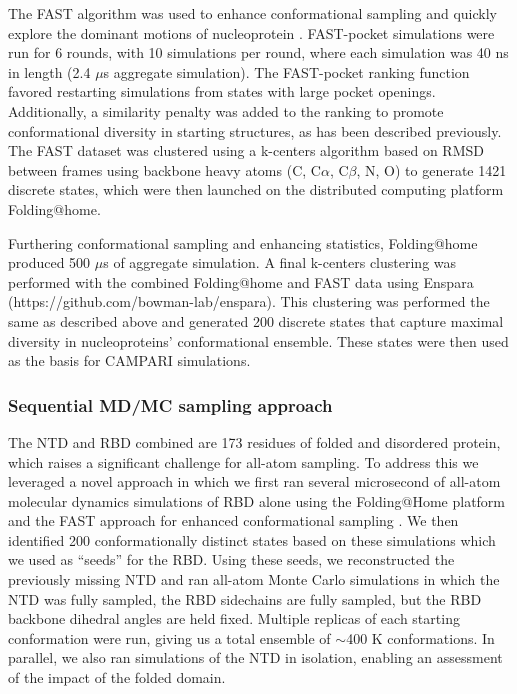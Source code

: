 \documentclass[../main.tex]{subfiles}
\begin{document}
        The FAST algorithm was used to enhance conformational sampling and quickly explore the dominant motions of nucleoprotein \cite{zimmerman_fast_2015,Zimmerman:2018jn}. FAST-pocket simulations were run for 6 rounds, with 10 simulations per round, where each simulation was 40 ns in length (2.4 $\mu$s aggregate simulation). The FAST-pocket ranking function favored restarting simulations from states with large pocket openings. Additionally, a similarity penalty was added to the ranking to promote conformational diversity in starting structures, as has been described previously\cite{zimmerman_prediction_2017}. The FAST dataset was clustered using a k-centers algorithm based on RMSD between frames using backbone heavy atoms (C, C$\alpha$, C$\beta$, N, O) to generate 1421 discrete states, which were then launched on the distributed computing platform Folding@home\cite{Shirts:2000du,Zimmerman2020covid-pocket}.

        Furthering conformational sampling and enhancing statistics, Folding@home produced 500 $\mu$s of aggregate simulation. A final k-centers clustering was performed with the combined Folding@home and FAST data using Enspara (https://github.com/bowman-lab/enspara)\cite{porter2018enspara}. This clustering was performed the same as described above and generated 200 discrete states that capture maximal diversity in nucleoproteins’ conformational ensemble. These states were then used as the basis for CAMPARI simulations.

    \subsubsection{Sequential MD/MC sampling approach}
        The NTD and RBD combined are 173 residues of folded and disordered protein, which raises a significant challenge for all-atom sampling. To address this we leveraged a novel approach in which we first ran several microsecond of all-atom molecular dynamics simulations of RBD alone using the Folding@Home platform and the FAST approach for enhanced conformational sampling \cite{Shirts:2000du,Zimmerman2020covid-pocket,zimmerman_fast_2015}. We then identified 200 conformationally distinct states based on these simulations which we used as “seeds” for the RBD. Using these seeds, we reconstructed the previously missing NTD and ran all-atom Monte Carlo simulations in which the NTD was fully sampled, the RBD sidechains are fully sampled, but the RBD backbone dihedral angles are held fixed. Multiple replicas of each starting conformation were run, giving us a total ensemble of $\sim$400 K conformations. In parallel, we also ran simulations of the NTD in isolation, enabling an assessment of the impact of the folded domain.
\end{document}
